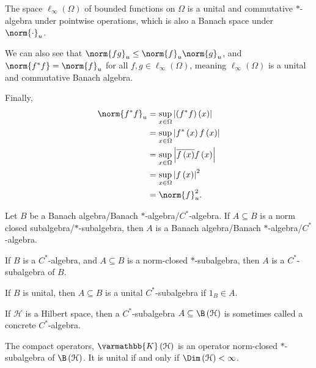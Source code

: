 \documentclass[10pt]{mypackage}
\renewcommand*{\mathbb}[1]{\varmathbb{#1}}
\begin{document}
\begin{example}
  The space $\ell_{\infty}\left(\Omega\right)$ of bounded functions on $\Omega$ is a unital and commutative $\ast$-algebra under pointwise operations, which is also a Banach space under $\norm{\cdot}_{u}$.\newline

  We can also see that $\norm{fg}_{u} \leq \norm{f}_{u}\norm{g}_{u}$, and $\norm{f^{\ast}f}= \norm{f}_u$ for all $f,g\in \ell_{\infty}\left(\Omega\right)$, meaning $\ell_{\infty}\left(\Omega\right)$ is a unital and commutative Banach algebra.\newline

  Finally,
  \begin{align*}
    \norm{f^{\ast}f}_{u} &= \sup_{x\in \Omega}\left\vert \left(f^{\ast}f\right)\left(x\right) \right\vert\\
                         &= \sup_{x\in \Omega}\left\vert f^{\ast}\left(x\right)f\left(x\right) \right\vert\\
                         &= \sup_{x\in \Omega}\left\vert \overline{f\left(x\right)} f\left(x\right)\right\vert\\
                         &= \sup_{x\in \Omega}\left\vert f\left(x\right) \right\vert^2\\
                         &= \norm{f}^2_u.
  \end{align*}
\end{example}
\begin{lemma}
  Let $B$ be a Banach algebra/Banach $\ast$-algebra/$C^{\ast}$-algebra. If $A\subseteq B$ is a norm closed subalgebra/$\ast$-subalgebra, then $A$ is a Banach algebra/Banach $\ast$-algebra/$C^{\ast}$-algebra.
\end{lemma}
\begin{definition}
  If $B$ is a $C^{\ast}$-algebra, and $A\subseteq B$ is a norm-closed $\ast$-subalgebra, then $A$ is a $C^{\ast}$-subalgebra of $B$.\newline

  If $B$ is unital, then $A\subseteq B$ is a unital $C^{\ast}$-subalgebra if $1_B\in A$.\newline

  If $\mathcal{H}$ is a Hilbert space, then a $C^{\ast}$-subalgebra $A\subseteq \B\left(\mathcal{H}\right)$ is sometimes called a concrete $C^{\ast}$-algebra.
\end{definition}
\begin{example}
  The compact operators, $\mathbb{K}\left(\mathcal{H}\right)$ is an operator norm-closed $\ast$-subalgebra of $\B\left(\mathcal{H}\right)$. It is unital if and only if $\Dim\left(\mathcal{H}\right) < \infty$.
\end{example}
\end{document}
